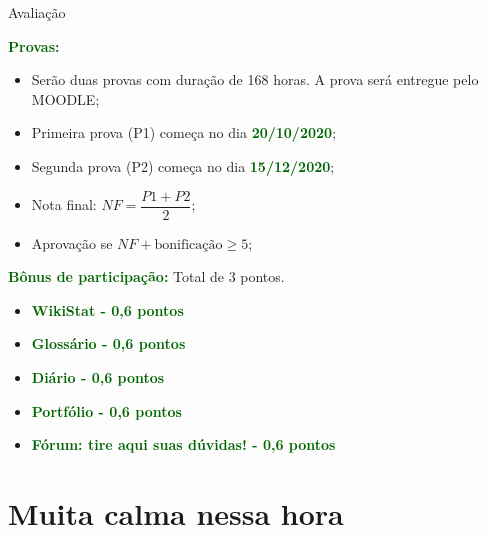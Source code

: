 \documentclass[9pt]{beamer}
\newcommand{\cc}[1]{\textcolor{darkgreen}{\bf #1}}
\begin{document}
\begin{frame}{Avaliação}

\cc{Provas:}

\begin{itemize}
	\item Serão duas provas com duração de 168 horas. A prova será entregue pelo MOODLE;
	\vfill
	
	\item Primeira prova (P1) começa no dia \cc{20/10/2020};
	\vfill
	
	\item Segunda prova (P2) começa no dia \cc{15/12/2020};
	\vfill
	
	\item Nota final: $NF = \dfrac{P1 + P2}{2}$;
	\vfill
	
	\item Aprovação se $NF + \mbox{bonificação} \geq 5$;
\end{itemize}
\vfill

\cc{Bônus de participação:} Total de 3 pontos. 
\begin{itemize}
	\item \cc{WikiStat - 0,6 pontos}
	\item \cc{Glossário - 0,6 pontos}
	\item \cc{Diário - 0,6 pontos}
	\item \cc{Portfólio - 0,6 pontos}
	\item \cc{Fórum: tire aqui suas dúvidas! - 0,6 pontos}
\end{itemize}
\end{frame}


\section{Muita calma nessa hora}
\end{document}
